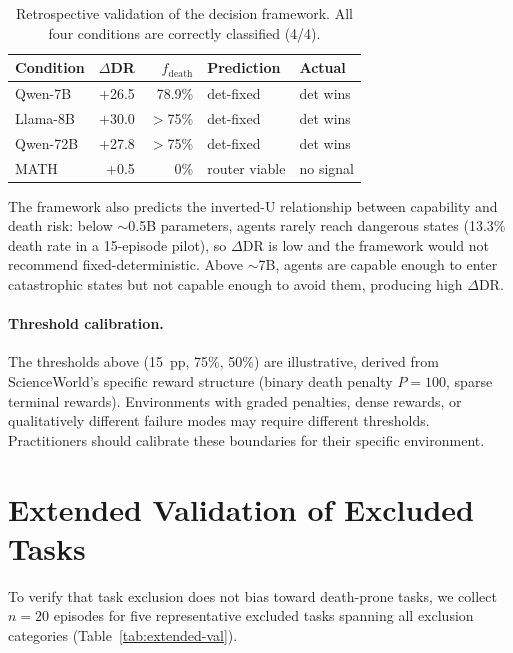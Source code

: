 \documentclass[11pt]{article}
\begin{document}
\begin{table}[h]
\centering
\small
\begin{tabular}{@{}lrrll@{}}
\toprule
Condition & $\Delta$DR & $f_{\text{death}}$ & Prediction & Actual \\
\midrule
Qwen-7B & +26.5 & 78.9\% & det-fixed & det wins \\
Llama-8B & +30.0 & $>$75\% & det-fixed & det wins \\
Qwen-72B & +27.8 & $>$75\% & det-fixed & det wins \\
MATH & +0.5 & 0\% & router viable & no signal \\
\bottomrule
\end{tabular}
\caption{Retrospective validation of the decision framework. All four conditions are correctly classified (4/4).}
\label{tab:decision-framework}
\end{table}

The framework also predicts the inverted-U relationship between capability and death risk: below ${\sim}$0.5B parameters, agents rarely reach dangerous states (13.3\% death rate in a 15-episode pilot), so $\Delta\text{DR}$ is low and the framework would not recommend fixed-deterministic. Above ${\sim}$7B, agents are capable enough to enter catastrophic states but not capable enough to avoid them, producing high $\Delta\text{DR}$.

\paragraph{Threshold calibration.} The thresholds above (15~pp, 75\%, 50\%) are illustrative, derived from ScienceWorld's specific reward structure (binary death penalty $P{=}100$, sparse terminal rewards). Environments with graded penalties, dense rewards, or qualitatively different failure modes may require different thresholds. Practitioners should calibrate these boundaries for their specific environment.

\section{Extended Validation of Excluded Tasks}
\label{app:extended-validation}

To verify that task exclusion does not bias toward death-prone tasks, we collect $n{=}20$ episodes for five representative excluded tasks spanning all exclusion categories (Table~\ref{tab:extended-val}).
\end{document}
